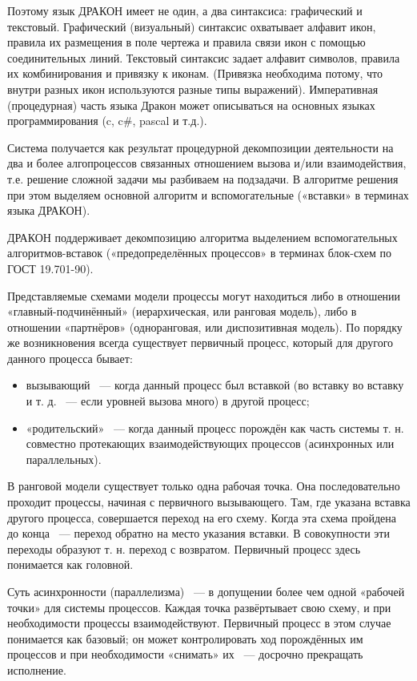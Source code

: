 Поэтому язык ДРАКОН имеет не один, а два синтаксиса: графический и текстовый.
Графический (визуальный) синтаксис охватывает алфавит икон, правила их размещения в поле чертежа и правила связи икон с помощью соединительных линий. Текстовый синтаксис задает алфавит символов, правила их комбинирования и привязку к иконам. (Привязка необходима потому, что внутри разных икон используются разные типы выражений). Императивная (процедурная) часть языка Дракон может описываться на основных языках программирования (c, c\#, pascal и т.д.).

Система получается как результат процедурной декомпозиции деятельности на два и более алгопроцессов связанных отношением вызова и/или взаимодействия, т.е. решение сложной задачи мы разбиваем на подзадачи. В алгоритме решения при этом выделяем основной алгоритм и вспомогательные («вставки» в терминах языка ДРАКОН).

ДРАКОН поддерживает декомпозицию алгоритма выделением вспомогательных алгоритмов-вставок («предопределённых процессов» в терминах блок-схем по ГОСТ 19.701-90).

Представляемые схемами модели процессы могут находиться либо в отношении «главный-подчинённый» (иерархическая, или ранговая модель), либо в отношении «партнёров» (одноранговая, или диспозитивная модель). По порядку же возникновения всегда существует первичный процесс, который для другого данного процесса бывает:
\begin{itemize}
\item вызывающий ~--- когда данный процесс был вставкой (во вставку во вставку и т. д. ~--- если уровней вызова много) в другой процесс;
\item «родительский» ~--- когда данный процесс порождён как часть системы т. н. совместно протекающих взаимодействующих процессов (асинхронных или параллельных).
\end{itemize}

В ранговой модели существует только одна рабочая точка. Она последовательно проходит процессы, начиная с первичного вызывающего. Там, где указана вставка другого процесса, совершается переход на его схему. Когда эта схема пройдена до конца ~--- переход обратно на место указания вставки. В совокупности эти переходы образуют т. н. переход с возвратом. Первичный процесс здесь понимается как головной.

Суть асинхронности (параллелизма) ~--- в допущении более чем одной «рабочей точки» для системы процессов. Каждая точка развёртывает свою схему, и при необходимости процессы взаимодействуют. Первичный процесс в этом случае понимается как базовый; он может контролировать ход порождённых им процессов и при необходимости «снимать» их ~--- досрочно прекращать исполнение.

